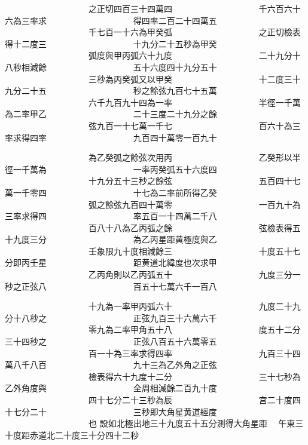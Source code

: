\begin{正文}
　　　　　　　　　　之正切四百三十四萬四
　　　　　　　　　　千六百六十六為三率求
　　　　　　　　　　得四率二百二十四萬五
　　　　　　　　　　千七百一十六為甲癸弧
　　　　　　　　　　之正切檢表得十二度三
　　　　　　　　　　十九分二十五秒為甲癸
　　　　　　　　　　弧度與甲丙弧六十九度
　　　　　　　　　　二十九分十八秒相減餘
　　　　　　　　　　五十六度四十九分五十
　　　　　　　　　　三秒為丙癸弧又以甲癸
　　　　　　　　　　十二度三十九分二十五
　　　　　　　　　　秒之餘弦九百七十五萬
　　　　　　　　　　六千九百九十四為一率
　　　　　　　　　　半徑一千萬為二率甲乙
　　　　　　　　　　二十三度二十九分之餘
　　　　　　　　　　弦九百一十七萬一千七
　　　　　　　　　　百六十為三率求得四率
　　　　　　　　　　九百四十萬零一百九十
\par
\end{正文}\clearpage
{}
\begin{正文}
　　　　　　　　　　為乙癸弧之餘弦次用丙
　　　　　　　　　　乙癸形以半徑一千萬為
　　　　　　　　　　一率丙癸弧五十六度四
　　　　　　　　　　十九分五十三秒之餘弦
　　　　　　　　　　五百四十七萬一千零四
　　　　　　　　　　十七為二率前所得乙癸
　　　　　　　　　　弧之餘弦九百四十萬零
　　　　　　　　　　一百九十為三率求得四
　　　　　　　　　　率五百一十四萬二千八
　　　　　　　　　　百八十八為乙丙弧之餘
　　　　　　　　　　弦檢表得五十九度三分
　　　　　　　　　　為乙丙星距黄極度與乙
　　　　　　　　　　壬象限九十度相減餘三
　　　　　　　　　　十度五十七分即丙壬星
　　　　　　　　　　距黄道北緯度也次求甲
　　　　　　　　　　乙丙角則以乙丙弧五十
　　　　　　　　　　九度三分一秒之正弦八
　　　　　　　　　　百五十七萬六千一百八
\par
\end{正文}\clearpage
{}
\begin{正文}
　　　　　　　　　　十九為一率甲丙弧六十
　　　　　　　　　　九度二十九分十八秒之
　　　　　　　　　　正弦九百三十六萬六千
　　　　　　　　　　零九為二率甲角五十八
　　　　　　　　　　度五十二分三十四秒之
　　　　　　　　　　正弦八百五十六萬零五
　　　　　　　　　　百一十為三率求得四率
　　　　　　　　　　九百三十四萬八千八百
　　　　　　　　　　九十三為乙外角之正弦
　　　　　　　　　　檢表得六十九度十二分
　　　　　　　　　　三十七秒為乙外角度與
　　　　　　　　　　全周相減餘二百九十度
　　　　　　　　　　四十七分二十三秒為辰
　　　　　　　　　　宫二十度四十七分二十
　　　　　　　　　　三秒即大角星黄道經度
　　　　　　　　　　也
設如北極出地三十九度五十五分測得大角星距
　午東三十度距赤道北二十度三十分四十二秒
\par
\end{正文}\clearpage
